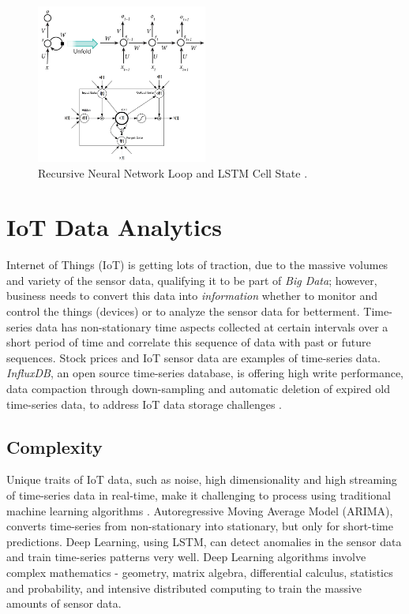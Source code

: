 \documentclass[sigconf]{acmart}
\begin{document}
	\begin{figure}
		\centering
		\includegraphics[width=0.5\textwidth]{images/rnn}
		\caption{Recursive Neural Network Loop and LSTM Cell State \cite{LeCun2015, Leonard2016}.} \label{fig:figure4} 
	\end{figure}

	
	\section{IoT Data Analytics}
	
	Internet of Things (IoT) is getting lots of traction, due to the massive volumes and variety of the sensor data, qualifying it to be part of {\em Big Data}; however, business needs to convert this data into {\em information} whether to monitor and control the things (devices) or to analyze the sensor data for betterment. Time-series data has non-stationary time aspects collected at certain intervals over a short period of time and correlate this sequence of data with past or future sequences. Stock prices and IoT sensor data are examples of time-series data. {\em InfluxDB}, an open source time-series database, is offering high write performance, data compaction through down-sampling and automatic deletion of expired old time-series data, to address IoT data storage challenges \cite{Influx}.	
	
	
	\subsection{Complexity}
	
	Unique traits of IoT data, such as noise, high dimensionality and high streaming of time-series data in real-time, make it challenging to process using traditional machine learning algorithms \cite{Sampathkumar2016}. Autoregressive Moving Average Model (ARIMA), converts time-series from non-stationary into stationary, but only for short-time predictions. Deep Learning, using LSTM, can detect anomalies in the sensor data and train time-series patterns very well. Deep Learning algorithms involve complex mathematics - geometry, matrix algebra, differential calculus, statistics and probability, and intensive distributed computing to train the massive amounts of sensor data.
	
\end{document}
